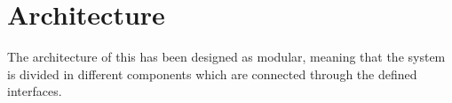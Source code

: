 \section{Architecture}

The architecture of this \epns has been designed as modular, meaning that the system is divided in different components which are connected through the defined interfaces.

